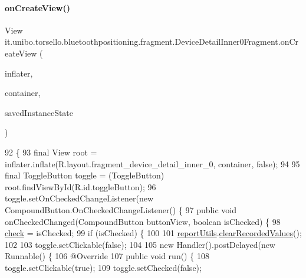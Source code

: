 \paragraph{\texorpdfstring{on\+Create\+View()}{onCreateView()}}
{\footnotesize\ttfamily View it.\+unibo.\+torsello.\+bluetoothpositioning.\+fragment.\+Device\+Detail\+Inner0\+Fragment.\+on\+Create\+View (\begin{DoxyParamCaption}\item[{Layout\+Inflater}]{inflater,  }\item[{View\+Group}]{container,  }\item[{Bundle}]{saved\+Instance\+State }\end{DoxyParamCaption})}


\begin{DoxyCode}
92                                                                                                       \{
93         \textcolor{keyword}{final} View root = inflater.inflate(R.layout.fragment\_device\_detail\_inner\_0, container, \textcolor{keyword}{false});
94 
95         \textcolor{keyword}{final} ToggleButton toggle = (ToggleButton) root.findViewById(R.id.toggleButton);
96         toggle.setOnCheckedChangeListener(\textcolor{keyword}{new} CompoundButton.OnCheckedChangeListener() \{
97             \textcolor{keyword}{public} \textcolor{keywordtype}{void} onCheckedChanged(CompoundButton buttonView, \textcolor{keywordtype}{boolean} isChecked) \{
98                 \hyperlink{classit_1_1unibo_1_1torsello_1_1bluetoothpositioning_1_1fragment_1_1DeviceDetailInner0Fragment_a9ced7df275f9d6ce94f9ade16c0b2920_a9ced7df275f9d6ce94f9ade16c0b2920}{check} = isChecked;
99                 \textcolor{keywordflow}{if} (isChecked) \{
100 
101                     \hyperlink{classit_1_1unibo_1_1torsello_1_1bluetoothpositioning_1_1fragment_1_1DeviceDetailInner0Fragment_aaca0aaeea8b6532c9e2683d415adfc59_aaca0aaeea8b6532c9e2683d415adfc59}{reportUtils}.\hyperlink{classit_1_1unibo_1_1torsello_1_1bluetoothpositioning_1_1util_1_1ReportUtils_aa83960dff58c2975a142c6b093abf72a_aa83960dff58c2975a142c6b093abf72a}{clearRecordedValues}();
102 
103                     toggle.setClickable(\textcolor{keyword}{false});
104 
105                     \textcolor{keyword}{new} Handler().postDelayed(\textcolor{keyword}{new} Runnable() \{
106                         @Override
107                         \textcolor{keyword}{public} \textcolor{keywordtype}{void} run() \{
108                             toggle.setClickable(\textcolor{keyword}{true});
109                             toggle.setChecked(\textcolor{keyword}{false});

\end{DoxyCode}
